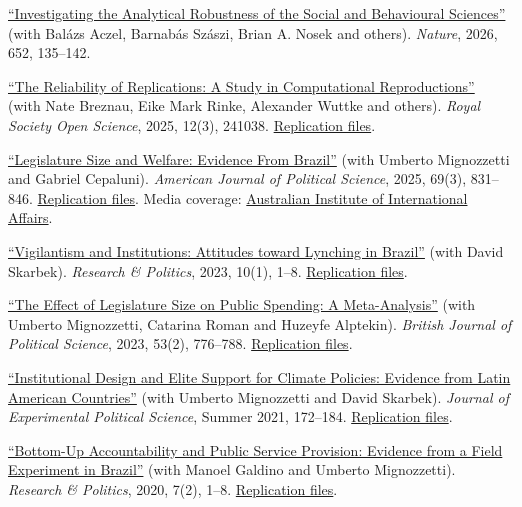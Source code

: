 \documentclass[a4paper]{article}
\renewenvironment{itemize}{
	\begin{list}{}{
			\setlength{\leftmargin}{1.5em}
		}
		}{
	\end{list}
}
\begin{document}
\begin{itemize}
\item \href{https://www.nature.com/articles/s41586-025-09844-9}{``Investigating the Analytical Robustness of the Social and Behavioural Sciences''} (with Bal\'{a}zs Aczel, Barnab\'{a}s Sz\'{a}szi, Brian A. Nosek and others). \textit{Nature}, 2026, 652, 135--142.
\item \href{https://doi.org/10.1098/rsos.241038}{``The Reliability of Replications: A Study in Computational Reproductions''} (with Nate Breznau, Eike Mark Rinke, Alexander Wuttke and others). \textit{Royal Society Open Science}, 2025, 12(3), 241038. \href{https://github.com/nbreznau/how_many_replicators}{Replication files}.
\item \href{https://doi.org/10.1111/ajps.12843}{``Legislature Size and Welfare: Evidence From Brazil''} (with Umberto Mignozzetti and Gabriel Cepaluni). \textit{American Journal of Political Science}, 2025, 69(3), 831--846. \href{https://github.com/umbertomig/legislature-size-welfare}{Replication files}. Media coverage: \href{https://www.internationalaffairs.org.au/australianoutlook/legislature-size-and-welfare-evidence-from-brazil/}{Australian Institute of International Affairs}.
\item \href{https://doi.org/10.1177/20531680221150389}{``Vigilantism and Institutions: Attitudes toward Lynching in Brazil''} (with David Skarbek). \textit{Research \& Politics}, 2023, 10(1), 1--8. \href{https://github.com/danilofreire/lynching-experiment-brazil}{Replication files}.
\item \href{https://doi.org/10.1017/S0007123422000552}{``The Effect of Legislature Size on Public Spending: A Meta-Analysis''} (with Umberto Mignozzetti, Catarina Roman and Huzeyfe Alptekin). \textit{British Journal of Political Science}, 2023, 53(2), 776--788. \href{https://github.com/danilofreire/legislature-size-meta-analysis}{Replication files}.
\item \href{https://doi.org/10.1017/XPS.2020.19}{``Institutional Design and Elite Support for Climate Policies: Evidence from Latin American Countries''} (with Umberto Mignozzetti and David Skarbek). \textit{Journal of Experimental Political Science}, Summer 2021, 172--184. \href{https://doi.org/10.7910/DVN/VTA5OA}{Replication files}.
\item \href{https://doi.org/10.1177%2F2053168020914444}{``Bottom-Up Accountability and Public Service Provision: Evidence from a Field Experiment in Brazil''} (with Manoel Galdino and Umberto Mignozzetti). \textit{Research \& Politics}, 2020, 7(2), 1--8. \href{https://github.com/umbertomig/tdp-accountability}{Replication files}.

\end{itemize}
\end{document}
